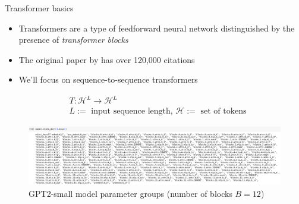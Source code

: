 
\begin{frame}{Transformer basics}

\begin{itemize}
    \item Transformers are a type of feedforward neural network distinguished by the presence of {\it transformer blocks}
    \item The original paper by \citet{Vaswani2017-em} has over 120,000 citations
    \item We'll focus on sequence-to-sequence transformers
\end{itemize}
\begin{align*}
    &T: \mathcal H^L \to \mathcal H^L \\
    &\text{$L :=$ input sequence length, $\mathcal H :=$ set of tokens}
\end{align*}
\begin{figure}
    \centering
    \includegraphics[width=12cm]{img/gpt2keys.png}
    \caption*{GPT2-small model parameter groups (number of blocks $B = 12$)}
    \label{fig:enter-label}
\end{figure}
\end{frame}

